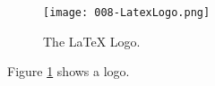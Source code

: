 \documentclass{article}
\begin{document}
\begin{figure}
  \texttt{[image: 008-LatexLogo.png]}
  \caption{The LaTeX Logo.}
  \label{fig:logo1}
\end{figure}

Figure \ref{fig:logo1} shows a logo.
\end{document}
